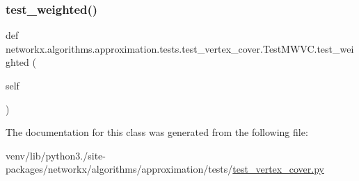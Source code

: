 \subsubsection{\texorpdfstring{test\+\_\+weighted()}{test\_weighted()}}
{\footnotesize\ttfamily def networkx.\+algorithms.\+approximation.\+tests.\+test\+\_\+vertex\+\_\+cover.\+Test\+M\+W\+V\+C.\+test\+\_\+weighted (\begin{DoxyParamCaption}\item[{}]{self }\end{DoxyParamCaption})}



The documentation for this class was generated from the following file\+:\begin{DoxyCompactItemize}
\item 
venv/lib/python3./site-\/packages/networkx/algorithms/approximation/tests/\hyperlink{test__vertex__cover_8py}{test\+\_\+vertex\+\_\+cover.\+py}\end{DoxyCompactItemize}
